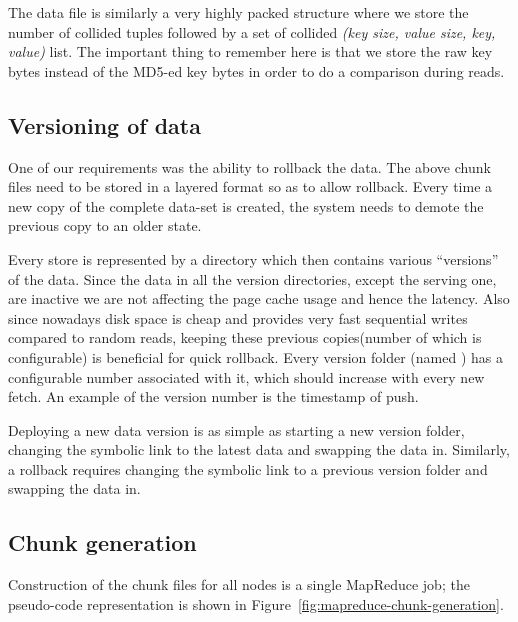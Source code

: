 The data file is similarly a very highly packed structure where we
store the number of collided tuples followed by a set of collided
\emph{(key size, value size, key, value)} list. The important thing to
remember here is that we store the raw key bytes instead of the MD5-ed
key bytes in order to do a comparison during reads. 


\subsection{Versioning of data}
\label{sec:read_only:versioning}

One of our requirements was the ability to rollback the data. The
above chunk files need to be stored in a layered format so as to allow
rollback. Every time a new copy of the complete data-set is created,
the system needs to demote the previous copy to an older state.

Every store is represented by a directory which then contains various
``versions'' of the data. Since the data in all the version
directories, except the serving one, are inactive we are not affecting
the page cache usage and hence the latency. Also since nowadays disk
space is cheap and provides very fast sequential writes compared to
random reads, keeping these previous copies(number of which is
configurable) is beneficial for quick rollback. Every version folder
(named ) has a configurable number associated
with it, which should increase with every new fetch. An example of the
version number is the timestamp of push. 

Deploying a new data version is as simple as starting a new version
folder, changing the symbolic link to the latest data and swapping the
data in. Similarly, a rollback requires changing the symbolic link to a 
previous version folder and swapping the data in. 


\subsection{Chunk generation}
\label{sec:read_only:chunk_generation}

Construction of the chunk files for all \projectname{} nodes is a
single MapReduce job; the pseudo-code representation is shown in
Figure~\ref{fig:mapreduce-chunk-generation}.


